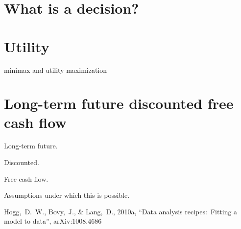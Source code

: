 \documentclass[12pt,twoside,pdftex]{article}
\begin{document}
\section{What is a decision?}

\section{Utility}

minimax and utility maximization

\section{Long-term future discounted free cash flow}

Long-term future.

Discounted.

Free cash flow.

Assumptions under which this is possible.

\clearpage
{}\theendnotes

\clearpage
\begin{thebibliography}{}\raggedright
{}
  Hogg,~D.~W., Bovy,~J., \& Lang,~D., 2010a,
  ``Data analysis recipes:\ Fitting a model to data'', arXiv:1008.4686
\end{thebibliography}
\end{document}
